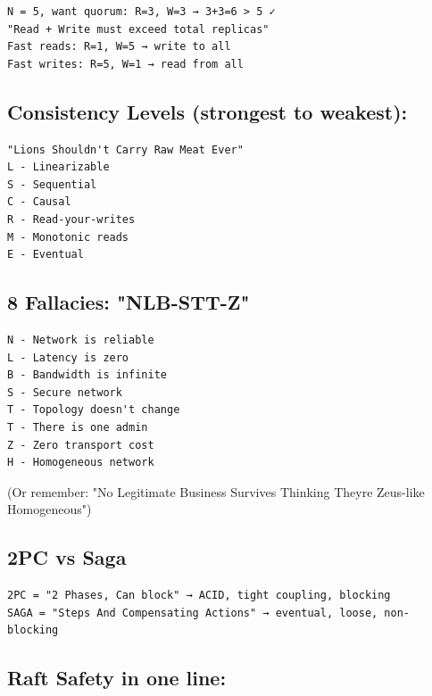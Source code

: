 \documentclass[11pt]{article}
\begin{document}
\begin{verbatim}
N = 5, want quorum: R=3, W=3 → 3+3=6 > 5 ✓
"Read + Write must exceed total replicas"
Fast reads: R=1, W=5 → write to all
Fast writes: R=5, W=1 → read from all
\end{verbatim}

\subsection{Consistency Levels (strongest to weakest):}\label{consistency-levels-strongest-to-weakest}

\setcodelang{}

\begin{verbatim}
"Lions Shouldn't Carry Raw Meat Ever"
L - Linearizable
S - Sequential
C - Causal
R - Read-your-writes
M - Monotonic reads
E - Eventual
\end{verbatim}

\subsection{8 Fallacies: "NLB-STT-Z"}\label{8-fallacies-nlb-stt-z}

\setcodelang{}

\begin{verbatim}
N - Network is reliable
L - Latency is zero
B - Bandwidth is infinite
S - Secure network
T - Topology doesn't change
T - There is one admin
Z - Zero transport cost
H - Homogeneous network
\end{verbatim}

(Or remember: "No Legitimate Business Survives Thinking They\textquotesingle re Zeus-like Homogeneous")

\subsection{2PC vs Saga}\label{2pc-vs-saga}

\setcodelang{}

\begin{verbatim}
2PC = "2 Phases, Can block" → ACID, tight coupling, blocking
SAGA = "Steps And Compensating Actions" → eventual, loose, non-blocking
\end{verbatim}

\subsection{Raft Safety in one line:}\label{raft-safety-in-one-line}
\end{document}
